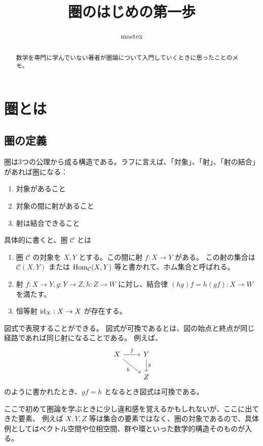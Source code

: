 \documentclass[uplatex,a4j,12pt,dvipdfmx]{jsarticle}
\title{
圏のはじめの第一歩
}
\author{
mastex
}
\begin{document}
\maketitle

\begin{abstract}
数学を専門に学んでいない著者が圏論について入門していくときに思ったことのメモ。
\end{abstract}

\section{圏とは}

\subsection{圏の定義}

圏は3つの公理から成る構造である。ラフに言えば、「対象」、「射」、「射の結合」があれば圏になる：

\begin{enumerate}
    \item 対象があること
    \item 対象の間に射があること
    \item 射は結合できること
\end{enumerate}

具体的に書くと、圏 ${\mathcal C}$ とは

\begin{enumerate}
    \item 圏 ${\mathcal C}$ の対象を $X,Y$ とする。この間に射 $f: X \to Y$ がある。
    この射の集合は ${\mathcal C}(X,Y)$ または ${\rm Hom}_{\mathcal C}(X,Y)$ 等と書かれて、ホム集合と呼ばれる。
    \item 射 $f: X \to Y, g: Y \to Z, h: Z \to W$ に対し、結合律 $(hg)f = h(gf): X \to W$ を満たす。
    \item 恒等射 ${\rm id}_{X}: X \to X$ が存在する。
\end{enumerate}

図式で表現することができる。
図式が可換であるとは、図の始点と終点が同じ経路であれば同じ射になることである。
例えば、
\[
\begin{tikzcd}
X \arrow[r,"f"]\arrow[rd,"h"'] & Y \arrow[d,"g"]\\
& Z
\end{tikzcd}
\]
のように書かれたとき、$gf=h$ となるとき図式は可換である。

ここで初めて圏論を学ぶときに少し違和感を覚えるかもしれないが、ここに出てきた要素、
例えば
$X,Y,Z$
等は集合の要素ではなく、圏の対象であるので、具体例としてはベクトル空間や位相空間、群や環といった数学的構造そのものが入る。
\end{document}
